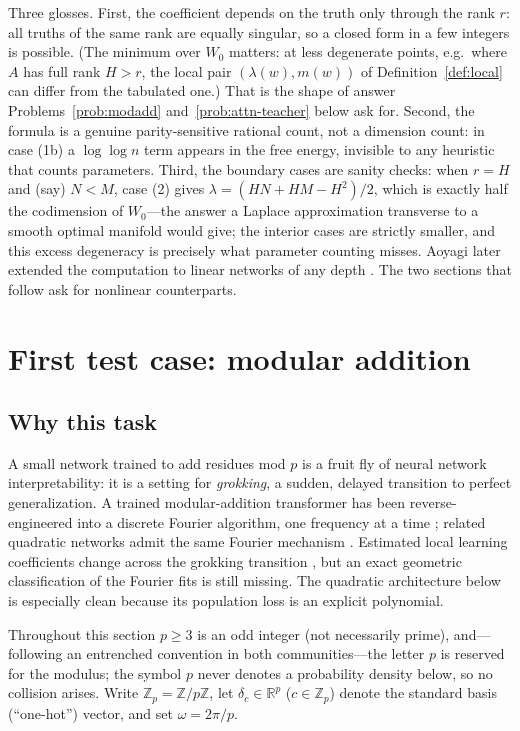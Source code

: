\documentclass[11pt]{amsart}
\theoremstyle{plain}
\theoremstyle{definition}
\newcommand{\R}{\mathbb{R}}
\newcommand{\Z}{\mathbb{Z}}
\begin{document}
Three glosses. First, the coefficient depends on the truth only through the rank $r$: all truths of the same rank are equally singular, so a closed form in a few integers is possible. (The minimum over $W_0$ matters: at less degenerate points, e.g.\ where $A$ has full rank $H > r$, the local pair $(\lambda(w), m(w))$ of Definition~\ref{def:local} can differ from the tabulated one.) That is the shape of answer Problems~\ref{prob:modadd} and~\ref{prob:attn-teacher} below ask for. Second, the formula is a genuine parity-sensitive rational count, not a dimension count: in case (1b) a $\log\log n$ term appears in the free energy, invisible to any heuristic that counts parameters. Third, the boundary cases are sanity checks: when $r = H$ and (say) $N < M$, case (2) gives $\lambda = (HN + HM - H^2)/2$, which is exactly half the codimension of $W_0$---the answer a Laplace approximation transverse to a smooth optimal manifold would give; the interior cases are strictly smaller, and this excess degeneracy is precisely what parameter counting misses. Aoyagi later extended the computation to linear networks of any depth \cite{aoyagi2024}. The two sections that follow ask for nonlinear counterparts.

\section{First test case: modular addition}\label{sec:modadd}

\subsection{Why this task}

A small network trained to add residues mod $p$ is a fruit fly of neural network interpretability: it is a setting for \emph{grokking}, a sudden, delayed transition to perfect generalization. A trained modular-addition transformer has been reverse-engineered into a discrete Fourier algorithm, one frequency at a time \cite{nanda2023}; related quadratic networks admit the same Fourier mechanism \cite{gromov2023}. Estimated local learning coefficients change across the grokking transition \cite{cullen2026}, but an exact geometric classification of the Fourier fits is still missing. The quadratic architecture below is especially clean because its population loss is an explicit polynomial.

Throughout this section $p \ge 3$ is an odd integer (not necessarily prime), and---following an entrenched convention in both communities---the letter $p$ is reserved for the modulus; the symbol $p$ never denotes a probability density below, so no collision arises. Write $\Z_p = \Z/p\Z$, let $\delta_c \in \R^p$ ($c \in \Z_p$) denote the standard basis (``one-hot'') vector, and set $\omega = 2\pi/p$.
\end{document}
